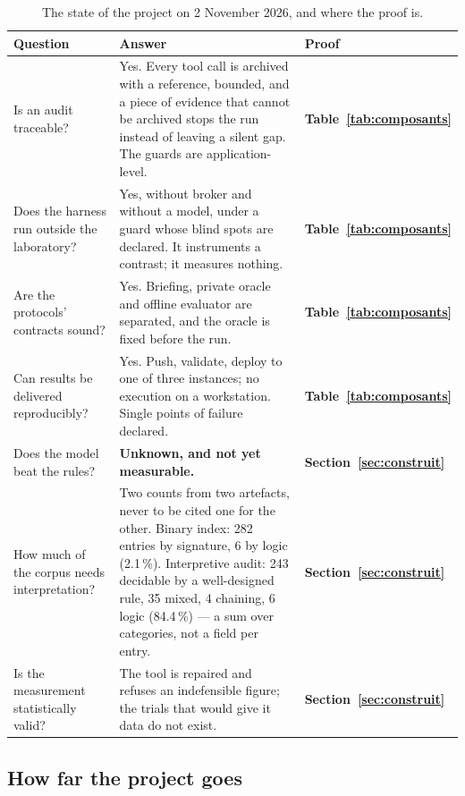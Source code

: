 \begin{table}[H]
\centering
\caption{The state of the project on 2 November 2026, and where the proof is.}
\label{tab:etat-chiffre}
\small
\begin{tabularx}{\linewidth}{@{}p{3.9cm}Yp{2.6cm}@{}}
\toprule
Question & Answer & \textbf{Proof} \\
\midrule
Is an audit traceable? & Yes. Every tool call is archived with a reference,
bounded, and a piece of evidence that cannot be archived stops the run instead of
leaving a silent gap. The guards are application-level. & \textbf{Table~\ref{tab:composants}} \\
Does the harness run outside the laboratory? & Yes, without broker and without a
model, under a guard whose blind spots are declared. It instruments a contrast; it
measures nothing. & \textbf{Table~\ref{tab:composants}} \\
Are the protocols' contracts sound? & Yes. Briefing, private oracle and offline
evaluator are separated, and the oracle is fixed before the run. & \textbf{Table~\ref{tab:composants}} \\
Can results be delivered reproducibly? & Yes. Push, validate, deploy to one of
three instances; no execution on a workstation. Single points of failure declared.
& \textbf{Table~\ref{tab:composants}} \\
Does the model beat the rules? & \textbf{Unknown, and not yet measurable.} & \textbf{Section~\ref{sec:construit}} \\
How much of the corpus needs interpretation? & Two counts from two artefacts,
never to be cited one for the other. Binary index: 282 entries by signature, 6 by
logic (2.1\,\%). Interpretive audit: 243 decidable by a well-designed rule, 35
mixed, 4 chaining, 6 logic (84.4\,\%) --- a sum over categories, not a field
per entry. & \textbf{Section~\ref{sec:construit}} \\
Is the measurement statistically valid? & The tool is repaired and refuses an
indefensible figure; the trials that would give it data do not exist. & \textbf{Section~\ref{sec:construit}} \\
\bottomrule
\end{tabularx}
\end{table}

\subsection{How far the project goes}
\label{sec:jusquou}


